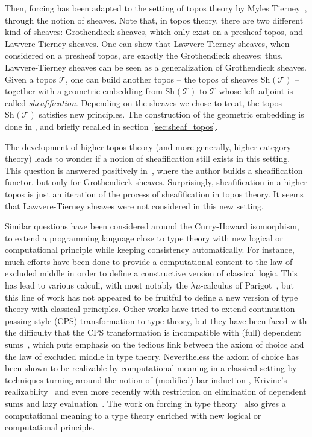 \documentclass[notfinal]{jfrarticle}
\newcommand \Sh[1] {\mathrm{Sh}_{#1}}
\begin{document}
Then, forcing has been adapted to the setting of topos theory by Myles
Tierney~\cite{tierney1972}, through the notion of sheaves.  Note that,
in topos theory, there are two different kind of sheaves: Grothendieck
sheaves, which only exist on a presheaf topos, and Lawvere-Tierney
sheaves. One can show that Lawvere-Tierney sheaves, when considered on
a presheaf topos, are exactly the Grothendieck sheaves; thus,
Lawvere-Tierney sheaves can be seen as a generalization of
Grothendieck sheaves.  Given a topos $\mathcal T$, one can build
another topos -- the topos of sheaves $\Sh{}(\mathcal T)$ -- together
with a geometric embedding from $\Sh{}(\mathcal T)$ to $\mathcal T$
whose left adjoint is
called {\em sheafification}.  Depending on the sheaves we chose to treat,
the topos $\Sh{}(\mathcal T)$ satisfies new principles. The
construction of the geometric embedding is done in \cite[Section
V.3]{maclanemoerdijk}, and briefly recalled in
section~\ref{sec:sheaf_topos}.

The development of higher topos theory (and more generally, higher
category theory) leads to wonder if a notion of sheafification still
exists in this setting. This question is answered positively
in~\cite{lurie}, where the author builds a sheafification functor, but
only for Grothendieck sheaves. Surprisingly, sheafification in a higher
topos is just an iteration of the process of sheafification in topos
theory. It seems that Lawvere-Tierney sheaves were not considered in
this new setting.

Similar questions have been considered around the Curry-Howard
isomorphism, to extend a programming language close to type theory
with new logical or computational principle while keeping consistency
automatically.
%
For instance, much efforts have been done to provide a computational
content to the law of excluded middle in order to define a
constructive version of classical logic. This has lead to various
calculi, with most notably the $\lambda \mu$-calculus of
Parigot~\cite{parigot1993classical}, but this line of work has not
appeared to be fruitful to define a new version of type theory with
classical principles.
%
Other works have tried to extend continuation-passing-style (CPS)
transformation to type theory, but they have been faced with the
difficulty that the CPS transformation is incompatible with (full) dependent
sums~\cite{barthe2002cps}, which puts emphasis on the tedious link
between the axiom of choice and the law of excluded middle in type theory.
%
Nevertheless the axiom of choice has been shown to be realizable by
computational meaning in a classical setting by techniques turning
around the notion of (modified) bar induction
\cite{berardi1998computational}, Krivine's
realizability~\cite{krivine2003dependent} and even more recently with
restriction on elimination of dependent sums and lazy
evaluation~\cite{herbelin2012constructive}.
The work on forcing in type theory~\cite{jaber2012extending,forcing2016} also
gives a computational meaning to a type theory enriched with new
logical or computational principle.
\end{document}
